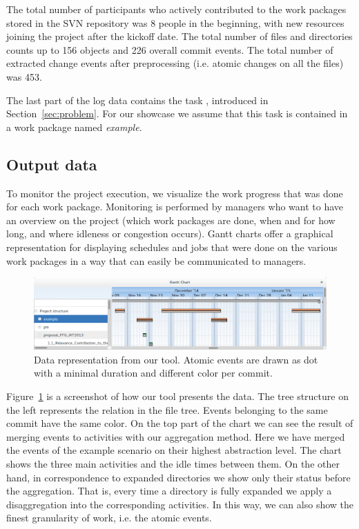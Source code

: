 The total number of participants who actively contributed to the work packages stored in the SVN repository was 8 people in the beginning, with new resources joining the project after the kickoff date. The total number of files and directories counts up to 156 objects and 226 overall commit events. The total number of extracted change events after preprocessing (i.e. atomic changes on all the files) was 453.

The last part of the log data contains the task , introduced in Section~\ref{sec:problem}. For our showcase we assume that this task is contained in a work package named \emph{example}.

\subsection{Output data}

To monitor the project execution, we visualize the work progress that was done for each work package. Monitoring is performed by managers who want to have an overview on the project (which work packages are done, when and for how long, and where idleness or congestion occurs). Gantt charts offer a graphical representation for displaying schedules and jobs that were done on the various work packages \cite{wilson2003gantt} in a way that can easily be communicated to managers.

\begin{figure}
\centering
\includegraphics[width=\textwidth]{bpm2015/imgs/aggregation_and_not}
\caption{Data representation from our tool. Atomic events are drawn as dot with a minimal duration and different color per commit. }
\label{fig:example-screenshot}
\end{figure}

Figure~\ref{fig:example-screenshot} is a screenshot of how our tool presents the data. The tree structure on the left represents the \parent relation in the file tree. Events belonging to the same commit have the same color. On the top part of the chart we can see the result of merging events to activities with our aggregation method. Here we have merged the events of the example scenario on their highest abstraction level. The chart shows the three main activities and the idle times between them. %
On the other hand, in correspondence to expanded directories we show only their status before the aggregation. That is, every time a directory is fully expanded we apply a disaggregation into the corresponding activities. In this way, we can also show the finest granularity of work, i.e. the atomic events.

